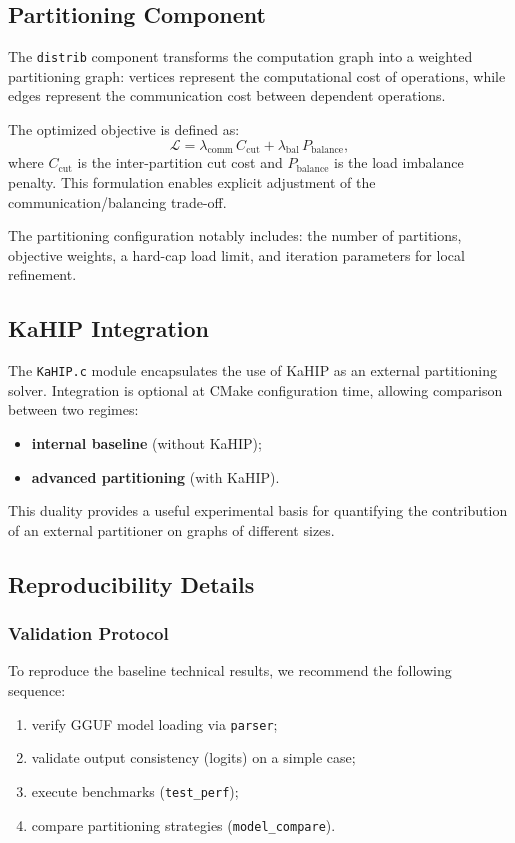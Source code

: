 \documentclass[11pt,a4paper]{article}
\begin{document}
\subsection{Partitioning Component}

The \texttt{distrib} component transforms the computation graph into a weighted partitioning graph: vertices represent the computational cost of operations, while edges represent the communication cost between dependent operations.

The optimized objective is defined as:
\[
\mathcal{L} = \lambda_{\mathrm{comm}}\,C_{\mathrm{cut}} + \lambda_{\mathrm{bal}}\,P_{\mathrm{balance}},
\]
where $C_{\mathrm{cut}}$ is the inter-partition cut cost and $P_{\mathrm{balance}}$ is the load imbalance penalty. This formulation enables explicit adjustment of the communication/balancing trade-off.

The partitioning configuration notably includes: the number of partitions, objective weights, a hard-cap load limit, and iteration parameters for local refinement.

\subsection{KaHIP Integration}

The \texttt{KaHIP.c} module encapsulates the use of KaHIP as an external partitioning solver. Integration is optional at CMake configuration time, allowing comparison between two regimes:
\begin{itemize}[leftmargin=*]
	\item \textbf{internal baseline} (without KaHIP);
	\item \textbf{advanced partitioning} (with KaHIP).
\end{itemize}

This duality provides a useful experimental basis for quantifying the contribution of an external partitioner on graphs of different sizes.

\subsection{Reproducibility Details}

\subsubsection{Validation Protocol}

To reproduce the baseline technical results, we recommend the following sequence:
\begin{enumerate}[leftmargin=*]
	\item verify GGUF model loading via \texttt{parser};
	\item validate output consistency (logits) on a simple case;
	\item execute benchmarks (\texttt{test\_perf});
	\item compare partitioning strategies (\texttt{model\_compare}).
\end{enumerate}
\end{document}
